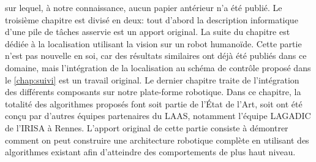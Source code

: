 sur lequel, à notre connaissance, aucun papier antérieur n'a été
publié. Le troisième chapitre est divisé en deux: tout d'abord la
description informatique d'une pile de tâches asservie est un apport
original. La suite du chapitre est dédiée à la localisation utilisant
la vision sur un robot humanoïde. Cette partie n'est pas nouvelle en
soi, car des résultats similaires ont déjà été publiés dans ce
domaine, mais l'intégration de la localisation au schéma de contrôle
proposé dans le \autoref{chap:suivi} est un travail original. Le
dernier chapitre traite de l'intégration des différents composants sur
notre plate-forme robotique. Dans ce chapitre, la totalité des
algorithmes proposés font soit partie de l'État de l'Art, soit ont été
conçu par d'autres équipes partenaires du LAAS, notamment l'équipe
LAGADIC de l'IRISA à Rennes. L'apport original de cette partie
consiste à démontrer comment on peut construire une architecture
robotique complète en utilisant des algorithmes existant afin
d'atteindre des comportements de plus haut niveau.
